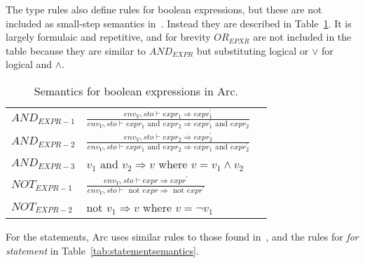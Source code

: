 The type rules also define rules for boolean expressions, but these are not included as small-step semantics in~\cite{Huttel2010}. Instead they are described in Table~\ref{tab:booleansemantics}. It is largely formulaic and repetitive, and for brevity $OR_{EPXR}$ are not included in the table because they are similar to $AND_{EXPR}$ but substituting logical or $\lor$ for logical and $\land$.


\begin{table}[htb!]
    \centering
    \begin{tabular}{lll}
        \toprule
        $AND_{EXPR-1}$ & $\frac
            {env_V, sto \vdash expr_1 \Rightarrow expr^\prime_1}
            {env_V, sto \vdash expr_1 \text{ and } expr_2 \Rightarrow expr^\prime_1 \text{ and } expr_2}$ \\ [12pt]
        $AND_{EXPR-2}$ & $\frac
            {env_V, sto \vdash expr_2 \Rightarrow expr^\prime_2}
            {env_V, sto \vdash expr_1 \text{ and } expr_2 \Rightarrow expr_1 \text{ and } expr^\prime_2}$ \\ [12pt]
        $AND_{EXPR-3}$ & $v_1 \text{ and } v_2 \Rightarrow v$ where $ v = v_1 \land v_2$                  \\ [12pt]
        $NOT_{EXPR-1}$ & $\frac
            {env_V, sto \vdash expr \Rightarrow expr^\prime}
            {env_V, sto \vdash \text{ not } expr \Rightarrow \text{ not } expr^\prime}$                   \\ [12pt]
        $NOT_{EXPR-2}$ & $\text{not } v_1 \Rightarrow v$ where $v = \neg v_1 $                            \\
        \bottomrule
    \end{tabular}
    \caption{Semantics for boolean expressions in Arc.}
    \label{tab:booleansemantics}
\end{table}


For the statements, Arc uses similar rules to those found in~\cite[Ch.~10]{Huttel2010}, and the rules for \textit{for statement} in Table~\ref{tab:statementsemantics}.


